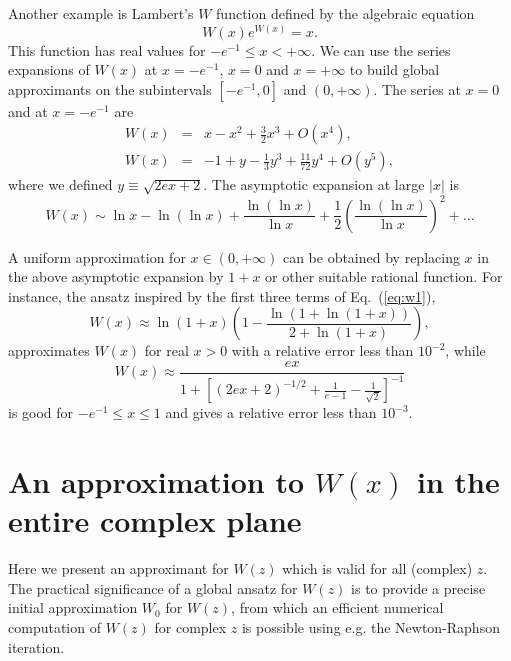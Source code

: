 \documentclass{llncs}
\begin{document}
Another example is Lambert's $W$ function defined by the algebraic
equation\begin{equation}
W\left(x\right)e^{W\left(x\right)}=x.\end{equation}
This function has real values for $-e^{-1}\leq x<+\infty $. We can
use the series expansions of $W\left(x\right)$ at $x=-e^{-1}$, $x=0$
and $x=+\infty $ to build global approximants on the subintervals
$\left[-e^{-1},0\right]$ and $\left(0,+\infty \right)$. The series
at $x=0$ and at $x=-e^{-1}$ are\begin{eqnarray}
W\left(x\right) & = & x-x^{2}+\frac{3}{2}x^{3}+O\left(x^{4}\right),\\
W\left(x\right) & = & -1+y-\frac{1}{3}y^{3}+\frac{11}{72}y^{4}+O\left(y^{5}\right),
\end{eqnarray}
where we defined $y\equiv \sqrt{2ex+2}$. The asymptotic expansion
at large $\left|x\right|$ is\begin{equation}
W\left(x\right)\sim \ln x-\ln \left(\ln x\right)+\frac{\ln \left(\ln x\right)}{\ln x}+\frac{1}{2}\left(\frac{\ln \left(\ln x\right)}{\ln x}\right)^{2}+...\label{eq:w1}\end{equation}


A uniform approximation for $x\in \left(0,+\infty \right)$ can be
obtained by replacing $x$ in the above asymptotic expansion by $1+x$
or other suitable rational function. For instance, the ansatz inspired
by the first three terms of Eq.~(\ref{eq:w1}),\begin{equation}
W\left(x\right)\approx \ln \left(1+x\right)\left(1-\frac{\ln \left(1+\ln \left(1+x\right)\right)}{2+\ln \left(1+x\right)}\right),\label{eq:w2}\end{equation}
approximates $W\left(x\right)$ for real $x>0$ with a relative error
less than $10^{-2}$, while\begin{equation}
W\left(x\right)\approx \frac{ex}{1+\left[\left(2ex+2\right)^{-1/2}+\frac{1}{e-1}-\frac{1}{\sqrt{2}}\right]^{-1}}\label{eq:w3}\end{equation}
is good for $-e^{-1}\leq x\leq 1$ and gives a relative error less
than $10^{-3}$.


\section{An approximation to $W\left(x\right)$ in the entire complex plane}

Here we present an approximant for $W\left(z\right)$ which is valid
for all (complex) $z$. The practical significance of a global ansatz
for $W\left(z\right)$ is to provide a precise initial approximation
$W_{0}$ for $W\left(z\right)$, from which an efficient numerical
computation of $W\left(z\right)$ for complex $z$ is possible using
e.g. the Newton-Raphson iteration.
\end{document}
